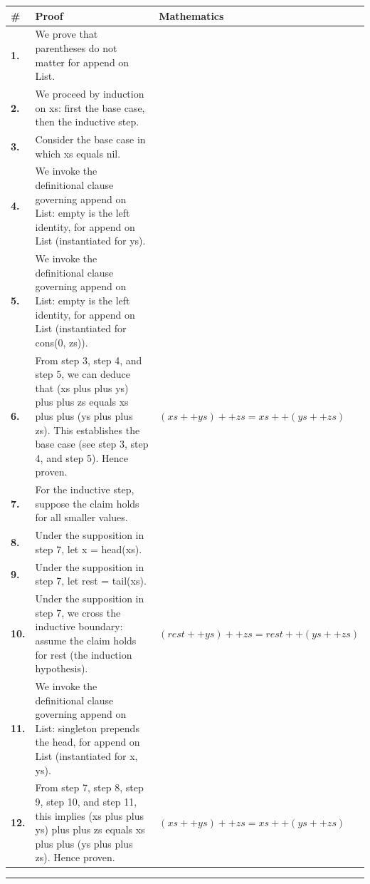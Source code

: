 \documentclass[11pt]{article}
\theoremstyle{definition}
\begin{document}
\begin{tabular}{@{} >{\raggedright\arraybackslash}p{} >{\raggedright\arraybackslash}p{} >{\raggedleft\arraybackslash}p{} @{}}
\textbf{\#} & \textbf{Proof} & \textbf{Mathematics} \\
\midrule
\textbf{1.} & We prove that parentheses do not matter for append on List. & \\[0.45em]
\textbf{2.} & We proceed by induction on xs: first the base case, then the inductive step. & \\[0.45em]
\textbf{3.} & Consider the base case in which xs  equals  nil. & \\[0.45em]
\textbf{4.} & We invoke the definitional clause governing append on List: empty is the left identity, for append on List (instantiated for ys). & \\[0.45em]
\textbf{5.} & We invoke the definitional clause governing append on List: empty is the left identity, for append on List (instantiated for cons(0, zs)). & \\[0.45em]
\textbf{6.} & From step 3, step 4, and step 5, we can deduce that (xs plus plus ys) plus plus zs equals xs plus plus (ys plus plus zs). This establishes the base case (see step 3, step 4, and step 5). Hence proven. & $\displaystyle (xs ++ ys) ++ zs = xs ++ (ys ++ zs)$ \\[0.45em]
\textbf{7.} & For the inductive step, suppose the claim holds for all smaller values. & \\[0.45em]
\textbf{8.} & Under the supposition in step 7, let x = head(xs). & \\[0.45em]
\textbf{9.} & Under the supposition in step 7, let rest = tail(xs). & \\[0.45em]
\textbf{10.} & Under the supposition in step 7, we cross the inductive boundary: assume the claim holds for rest (the induction hypothesis). & $\displaystyle (rest ++ ys) ++ zs = rest ++ (ys ++ zs)$ \\[0.45em]
\textbf{11.} & We invoke the definitional clause governing append on List: singleton prepends the head, for append on List (instantiated for x, ys). & \\[0.45em]
\textbf{12.} & From step 7, step 8, step 9, step 10, and step 11, this implies (xs plus plus ys) plus plus zs equals xs plus plus (ys plus plus zs). Hence proven. & $\displaystyle (xs ++ ys) ++ zs = xs ++ (ys ++ zs)$ \\[0.45em]
\bottomrule
\end{tabular}
\label{thm:List-append-parentheses_do_not_matter}
\par\medskip\hrule
\end{document}
